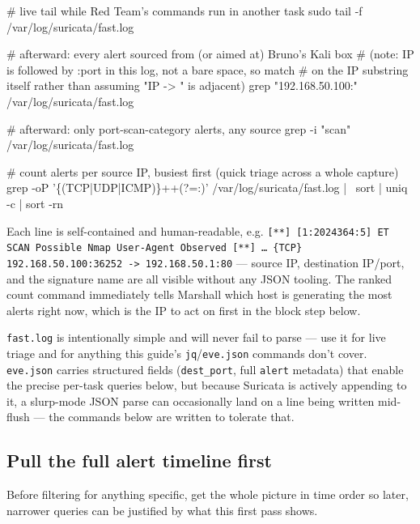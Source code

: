\documentclass[11pt,a4paper]{article}
\begin{document}
\begin{cmdbox}
\begin{cmdverb}
# live tail while Red Team's commands run in another task
sudo tail -f /var/log/suricata/fast.log

# afterward: every alert sourced from (or aimed at) Bruno's Kali box
# (note: IP is followed by :port in this log, not a bare space, so match
# on the IP substring itself rather than assuming "IP -> " is adjacent)
grep "192.168.50.100:" /var/log/suricata/fast.log

# afterward: only port-scan-category alerts, any source
grep -i "scan" /var/log/suricata/fast.log

# count alerts per source IP, busiest first (quick triage across a whole capture)
grep -oP '\{(TCP|UDP|ICMP)\}\s+\K[0-9.]+(?=:)' /var/log/suricata/fast.log | \
  sort | uniq -c | sort -rn
\end{cmdverb}
\end{cmdbox}

\begin{expectbox}
Each line is self-contained and human-readable, e.g.
\texttt{[**] [1:2024364:5] ET SCAN Possible Nmap User-Agent Observed [**]
\ldots\ \{TCP\} 192.168.50.100:36252 -> 192.168.50.1:80} --- source IP, destination
IP/port, and the signature name are all visible without any JSON tooling. The
ranked count command immediately tells Marshall which host is generating the most
alerts right now, which is the IP to act on first in the block step below.
\end{expectbox}

\begin{notebox}
\texttt{fast.log} is intentionally simple and will never fail to parse --- use it for
live triage and for anything this guide's \texttt{jq}/\texttt{eve.json} commands don't
cover. \texttt{eve.json} carries structured fields (\texttt{dest\_port}, full
\texttt{alert} metadata) that enable the precise per-task queries below, but because
Suricata is actively appending to it, a slurp-mode JSON parse can occasionally land on
a line being written mid-flush --- the commands below are written to tolerate that.
\end{notebox}

\subsection{Pull the full alert timeline first}
Before filtering for anything specific, get the whole picture in time order so later,
narrower queries can be justified by what this first pass shows.
\end{document}
